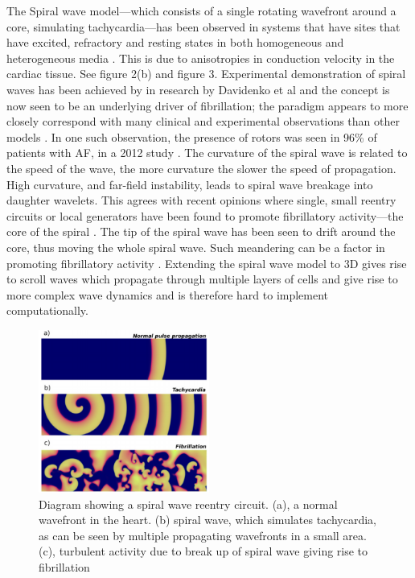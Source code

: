 \documentclass[twocolumn]{article}
\begin{document}
The Spiral wave model---which consists of a single rotating wavefront around a core, simulating tachycardia---has been observed in systems that have sites that have excited, refractory and resting states in both homogeneous and heterogeneous media \cite{Greenburg} \cite{Bub}. This is due to anisotropies in conduction velocity in the cardiac tissue. See figure 2(b) and figure 3. %
 Experimental demonstration of spiral waves has been achieved by in research by Davidenko et al and the concept is now seen to be an underlying driver of fibrillation; the paradigm appears to more closely correspond with many clinical and experimental observations than other models \cite{Davidenko} \cite{Comtois}. In one such observation, the presence of rotors was seen in 96\% of patients with AF, in a 2012 study \cite{afstudy}. The curvature of the spiral wave is related to the speed of the wave, the more curvature the slower the speed of propagation. High curvature, and far-field instability, leads to spiral wave breakage into daughter wavelets. This agrees with
recent opinions where single, small reentry circuits or local generators have been found to promote fibrillatory activity---the core of the spiral \cite{Skanes} \cite{Nattel2}. The tip of the spiral wave has been seen to drift around the core, thus moving the whole spiral wave. Such meandering can be a factor in promoting fibrillatory activity \cite{Tusscher}.
 Extending the spiral wave model to 3D gives rise to scroll waves which propagate through multiple layers of cells and give rise to more complex wave dynamics and is therefore hard to implement computationally.  %


\begin{figure}
\caption[short title]{Diagram showing a spiral wave reentry circuit. (a), a normal wavefront in the heart. (b) spiral wave, which simulates tachycardia, as can be seen by multiple propagating wavefronts in a small area. (c), turbulent activity due to break up of spiral wave giving rise to fibrillation \cite{Alonso}}
\centering
\includegraphics[width = 0.5\textwidth]{spiralbreak2tachy}
\end{figure}
\end{document}
